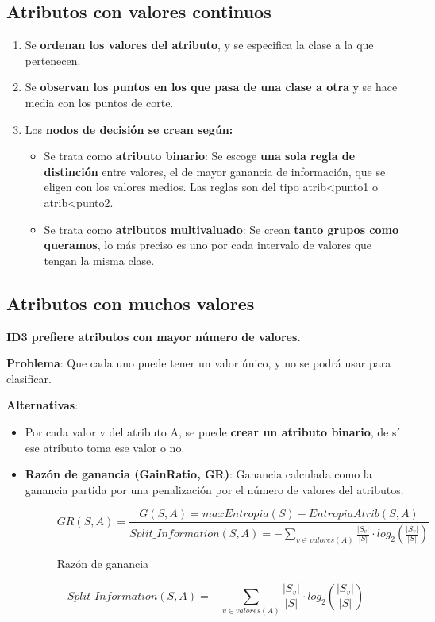 \documentclass[12pt, twoside, openright]{report} %
\begin{document}
\subsection{Atributos con valores
	continuos}
\begin{enumerate}
	\def\labelenumi{\arabic{enumi}.}
	\item Se \textbf{ordenan los valores del atributo}, y se especifica la clase a la que pertenecen.
	\item Se \textbf{observan los puntos en los que pasa de una clase a otra} y se hace media con los puntos de corte.
	\item Los \textbf{nodos de decisión se crean según:}

	      \begin{itemize}
		      \item Se trata como \textbf{atributo binario}: Se escoge \textbf{una sola regla de distinción} entre valores, el de mayor ganancia de información, que se eligen con los valores medios. Las reglas son del tipo atrib\textless punto1 o atrib\textless punto2.
		      \item Se trata como \textbf{atributos multivaluado}: Se crean
		            \textbf{tanto grupos como queramos}, lo más preciso es uno por cada intervalo de valores que tengan la misma clase.
	      \end{itemize}
\end{enumerate}

\subsection{Atributos con muchos valores}

\textbf{ID3 prefiere atributos con mayor número de valores.}

\textbf{Problema}: Que cada uno puede tener un valor único, y no se podrá usar para clasificar.

\textbf{Alternativas}:

\begin{itemize}
	\item Por cada valor v del atributo A, se puede \textbf{crear un atributo binario}, de sí ese atributo toma ese valor o no.
	      \pagebreak
	\item \textbf{Razón de ganancia (GainRatio, GR)}: Ganancia calculada como la ganancia partida por una penalización por el número de valores del atributos.
	      \begin{figure}[H]
		      $$
			      GR(S, A)= \frac {G(S, A)=max Entropia(S)-EntropiaAtrib(S, A)}{\textit{Split\_Information}(S, A)=-\sum_{v\in valores(A)} \frac {|S_v|}{|S|} \cdot log_2(\frac {|S_v|}{|S|})}
		      $$
		      \captionsetup{justification=centering}
		      \caption{Razón de ganancia}
	      \end{figure}
	      $$
		      \textit{Split\_Information}(S, A)=-\sum_{v\in valores(A)} \frac {|S_v|}{|S|} \cdot log_2(\frac {|S_v|}{|S|})
	      $$
\end{itemize}
\end{document}
